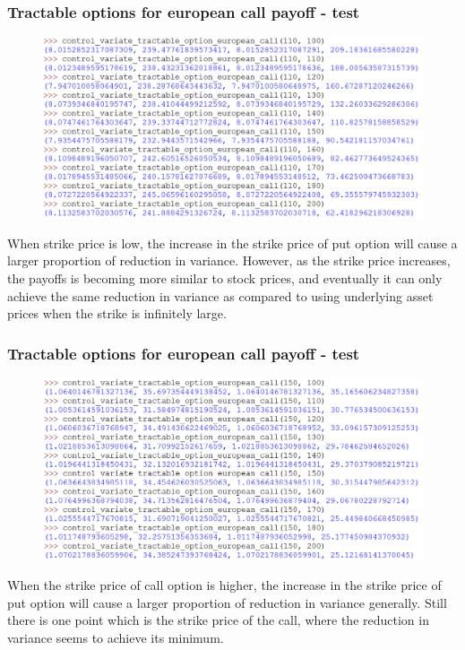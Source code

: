 \documentclass{beamer}
\begin{document}
\begin{frame}
\frametitle{Tractable options for european call payoff - test}
\begin{figure}[H]
	\includegraphics[scale=0.36]{control_variate_european_call_put_option_test1.png}
\end{figure}
When strike price is low, the increase in the strike price of put option will cause a larger proportion of reduction in variance.  However, as the strike price increases, the payoffs is becoming more similar to stock prices, and eventually it can only achieve the same reduction in variance as compared to using underlying asset prices when the strike is infinitely large.
\end{frame}

\begin{frame}
\frametitle{Tractable options for european call payoff - test}
\begin{figure}[H]
	\includegraphics[scale=0.38]{control_variate_european_call_put_option_test2.png}
\end{figure}
When the strike price of call option is higher, the increase in the strike price of put option will cause a larger proportion of reduction in variance generally. Still there is one point which is the strike price of the call, where the reduction in variance seems to achieve  its minimum.
\end{frame}
\end{document}
